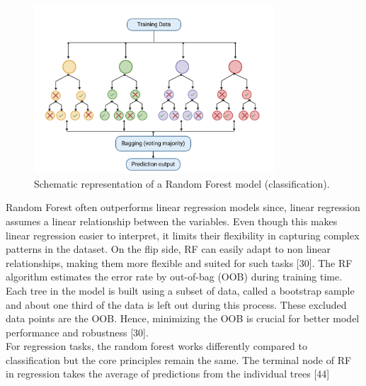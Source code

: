 \documentclass[12pt,a4paper]{report}
\begin{document}
\begin{figure}[h]
    \centering
    \includegraphics[width=0.8\textwidth]{Figures/rf.png}
    \caption{Schematic representation of a Random Forest model (classification).}
    \label{fig:rf}
\end{figure}

Random Forest often outperforms linear regression models since, linear regression assumes a linear relationship between the variables. Even though this makes linear regression easier to interpret, it limits their flexibility in capturing complex patterns in the dataset. 
On the flip side, RF can easily adapt to non linear relationships, making them more flexible and suited for such tasks [30]. The RF algorithm estimates the error rate by out-of-bag (OOB) during training time. Each tree in the model is built using a subset of data, called a 
bootstrap sample and about one third of the data is left out during this process. These excluded data points are the OOB. Hence, minimizing the OOB is crucial for better model performance and robustness [30]. \\


For regression tasks, the random forest works differently compared to classification but the core principles remain the same. The terminal node of RF in regression takes the average of predictions from the individual trees [44]
\end{document}
